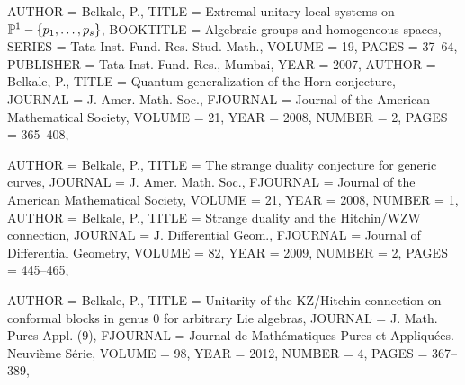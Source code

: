 \begin{bibdiv}
\begin{biblist}
 {
    AUTHOR = {Belkale, P.},
     TITLE = {Extremal unitary local systems on {$\Bbb
              P^1-\{p_1,\dots,p_s\}$}},
 BOOKTITLE = {Algebraic groups and homogeneous spaces},
    SERIES = {Tata Inst. Fund. Res. Stud. Math.},
    VOLUME = {19},
     PAGES = {37--64},
 PUBLISHER = {Tata Inst. Fund. Res., Mumbai},
      YEAR = {2007},
}
 {
    AUTHOR = {Belkale, P.},
     TITLE = {Quantum generalization of the {H}orn conjecture},
   JOURNAL = {J. Amer. Math. Soc.},
  FJOURNAL = {Journal of the American Mathematical Society},
    VOLUME = {21},
      YEAR = {2008},
    NUMBER = {2},
     PAGES = {365--408},
}

 {
    AUTHOR = {Belkale, P.},
     TITLE = {The strange duality conjecture for generic curves},
   JOURNAL = {J. Amer. Math. Soc.},
  FJOURNAL = {Journal of the American Mathematical Society},
    VOLUME = {21},
      YEAR = {2008},
    NUMBER = {1},
}
 {
    AUTHOR = {Belkale, P.},
     TITLE = {Strange duality and the {H}itchin/{WZW} connection},
   JOURNAL = {J. Differential Geom.},
  FJOURNAL = {Journal of Differential Geometry},
    VOLUME = {82},
      YEAR = {2009},
    NUMBER = {2},
     PAGES = {445--465},
}

{} {
    AUTHOR = {Belkale, P.},
     TITLE = {Unitarity of the {KZ}/{H}itchin connection on conformal blocks
              in genus 0 for arbitrary {L}ie algebras},
   JOURNAL = {J. Math. Pures Appl. (9)},
  FJOURNAL = {Journal de Math\'{e}matiques Pures et Appliqu\'{e}es. Neuvi\`eme S\'{e}rie},
    VOLUME = {98},
      YEAR = {2012},
    NUMBER = {4},
     PAGES = {367--389},
}


\end{biblist}
\end{bibdiv}
